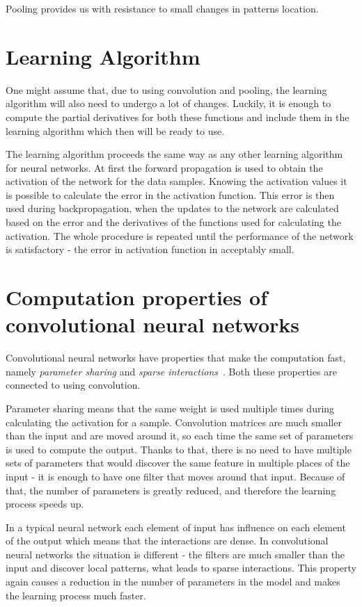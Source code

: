 \documentclass[a4paper,10pt]{report}
\begin{document}
	  Pooling provides us with resistance to small changes in patterns location.
  	  
      
      \section{Learning Algorithm}
      One might assume that, due to using convolution and pooling, the learning algorithm will also need to undergo a lot of changes. Luckily, it is enough to compute the partial derivatives for both these functions and include them in the learning algorithm which then will be ready to use.
      
      The learning algorithm proceeds the same way as any other learning algorithm for neural networks. At first the forward propagation is used to obtain the activation of the network for the data samples. Knowing the activation values it is possible to calculate the error in the activation function. This error is then used during backpropagation, when the updates to the network are calculated based on the error and the derivatives of the functions used for calculating the activation. The whole procedure is repeated until the performance of the network is satisfactory - the error in activation function in acceptably small.
      
       \section{Computation properties of convolutional neural networks}
      	  Convolutional neural networks have properties that make the computation fast, namely \emph{parameter sharing} and \emph{sparse interactions}~\cite{Bengio}. Both these properties are connected to using convolution. 
	  
	  Parameter sharing means that the same weight is used multiple times during calculating the activation for a sample.
	  Convolution matrices are much smaller than the input and are moved around it, so each time the same set of parameters is used to compute the output. Thanks to that, there is no need to have multiple sets of parameters that would discover the same feature in multiple places of the input - it is enough to have one filter that moves around that input. Because of that, the number of parameters is greatly reduced, and therefore the learning process speeds up. 
	  
	  In a typical neural network each element of input has influence on each element of the output which means that the interactions are dense. In convolutional neural networks the situation is different - the filters are much smaller than the input and discover local patterns, what leads to sparse interactions. This property again causes a reduction in the number of parameters in the model and makes the learning process much faster.
	
\end{document}
